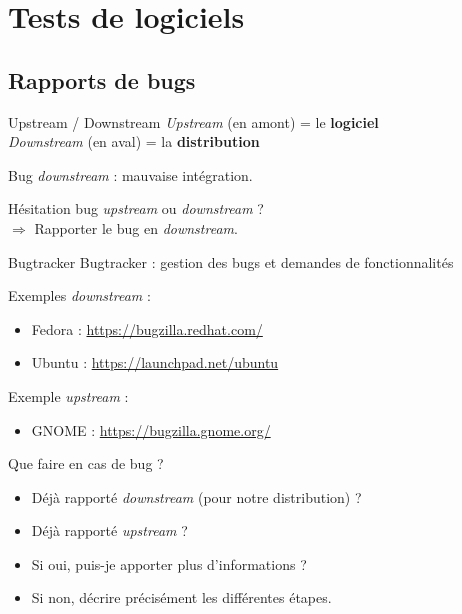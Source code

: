 \documentclass{beamer}
\begin{document}
\section{Tests de logiciels}
\begin{frame}
  \tableofcontents[sectionstyle=show/shaded, hideothersubsections]
\end{frame}

\subsection{Rapports de bugs}
\begin{frame}{Upstream / Downstream}
  \textit{Upstream} (en amont) = le \textbf{logiciel}\\
  \textit{Downstream} (en aval) = la \textbf{distribution}

  \bigskip
  Bug \textit{downstream} : mauvaise intégration.

  \bigskip
  Hésitation bug \textit{upstream} ou \textit{downstream} ?\\
  $ \Rightarrow $ Rapporter le bug en \textit{downstream}.
\end{frame}

\begin{frame}{Bugtracker}
  Bugtracker : gestion des bugs et demandes de fonctionnalités

  \bigskip
  Exemples \textit{downstream} :
  \begin{itemize}
    \item Fedora : \url{https://bugzilla.redhat.com/}
    \item Ubuntu : \url{https://launchpad.net/ubuntu}
  \end{itemize}

  \bigskip
  Exemple \textit{upstream} :
  \begin{itemize}
    \item GNOME : \url{https://bugzilla.gnome.org/}
  \end{itemize}
\end{frame}

\begin{frame}{Que faire en cas de bug ?}
  \begin{itemize}
    \item Déjà rapporté \textit{downstream} (pour notre distribution) ?
    \item Déjà rapporté \textit{upstream} ?
    \medskip
    \item Si oui, puis-je apporter plus d'informations ?
    \item Si non, décrire précisément les différentes étapes.
  \end{itemize}
\end{frame}
\end{document}
